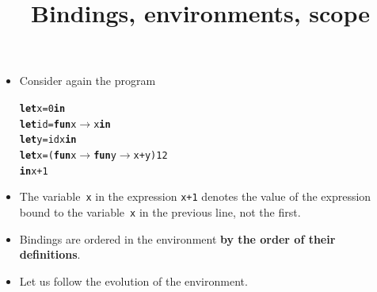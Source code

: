 \documentclass[wide]{slides}
\begin{document}
\begin{slide}
  \title{Bindings, environments, scope}

  \begin{itemize}

    \item Consider again the program
      \smallskip
\begin{alltt}
\textbf{let} x = 0 \textbf{in}
\textbf{let} id = \textbf{fun} x \(\rightarrow\) x \textbf{in}
\textbf{let} y = id x \textbf{in}
\textbf{let} x = (\textbf{fun} x \(\rightarrow\) \textbf{fun} y \(\rightarrow\) x + y) 1 2
\textbf{in} x + 1
\end{alltt}

    \item The variable~\texttt{x} in the expression \texttt{x+1}
      denotes the value of the expression bound to the
      variable~\texttt{x} in the previous line, not the first.

    \item Bindings are ordered in the environment \textbf{by the order
      of their definitions}.

    \item Let us follow the evolution of the environment.

  \end{itemize}

\end{slide}
\end{document}
